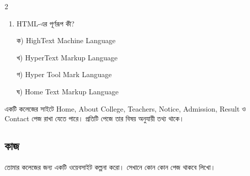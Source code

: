 \begin{multicols}{2}
\begin{enumerate}[leftmargin=*,itemsep=5pt]
\item \begin{minipage}[t]{\linewidth}\vspace{0pt}
HTML-এর পূর্ণরূপ কী?
\par ক) HighText Machine Language
\par খ) HyperText Markup Language
\par গ) Hyper Tool Mark Language
\par ঘ) Home Text Markup Language\\
\end{minipage}
\end{enumerate}
\end{multicols}

একটি কলেজের সাইটে Home, About College, Teachers, Notice, Admission, Result ও Contact পেজ রাখা যেতে পারে। প্রতিটি পেজে তার বিষয় অনুযায়ী তথ্য থাকে।

\subsection{কাজ}

\begin{practicebox}
তোমার কলেজের জন্য একটি ওয়েবসাইট কল্পনা করো। সেখানে কোন কোন পেজ থাকবে লিখো।

\end{practicebox}

